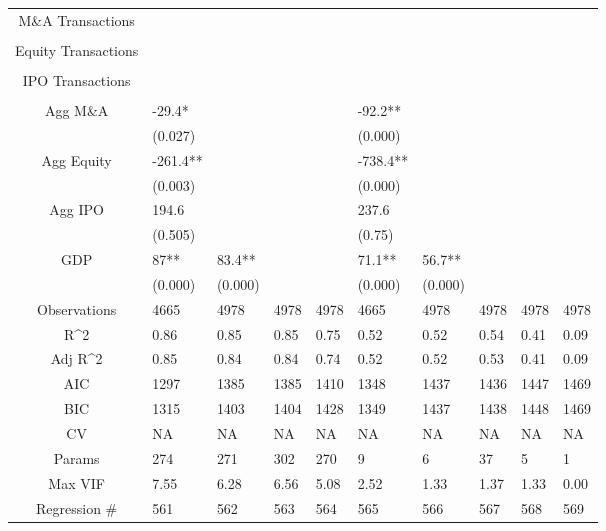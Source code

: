 \documentclass{article}
\begin{document}
\begin{table}[H]
\begin{tabular}{|clllllllll|}
  M\&A Transactions &  &  &  &  &  &  &  &  &  \\ 
   &  &  &  &  &  &  &  &  &  \\ 
  Equity Transactions &  &  &  &  &  &  &  &  &  \\ 
   &  &  &  &  &  &  &  &  &  \\ 
  IPO Transactions &  &  &  &  &  &  &  &  &  \\ 
   &  &  &  &  &  &  &  &  &  \\ 
  Agg M\&A & -29.4* &  &  &  & -92.2** &  &  &  &  \\ 
   & (0.027) &  &  &  & (0.000) &  &  &  &  \\ 
  Agg Equity & -261.4** &  &  &  & -738.4** &  &  &  &  \\ 
   & (0.003) &  &  &  & (0.000) &  &  &  &  \\ 
  Agg IPO & 194.6 &  &  &  & 237.6 &  &  &  &  \\ 
   & (0.505) &  &  &  & (0.75) &  &  &  &  \\ 
  GDP & 87** & 83.4** &  &  & 71.1** & 56.7** &  &  &  \\ 
   & (0.000) & (0.000) &  &  & (0.000) & (0.000) &  &  &  \\ 
  \hline 
 Observations & 4665 & 4978 & 4978 & 4978 & 4665 & 4978 & 4978 & 4978 & 4978 \\ 
  R^2 & 0.86 & 0.85 & 0.85 & 0.75 & 0.52 & 0.52 & 0.54 & 0.41 & 0.09 \\ 
  Adj R^2 & 0.85 & 0.84 & 0.84 & 0.74 & 0.52 & 0.52 & 0.53 & 0.41 & 0.09 \\ 
  AIC & 1297 & 1385 & 1385 & 1410 & 1348 & 1437 & 1436 & 1447 & 1469 \\ 
  BIC & 1315 & 1403 & 1404 & 1428 & 1349 & 1437 & 1438 & 1448 & 1469 \\ 
  CV & NA & NA & NA & NA & NA & NA & NA & NA & NA \\ 
  Params & 274 & 271 & 302 & 270 & 9 & 6 & 37 & 5 & 1 \\ 
  Max VIF & 7.55 & 6.28 & 6.56 & 5.08 & 2.52 & 1.33 & 1.37 & 1.33 & 0.00 \\ 
  Regression \# & 561 & 562 & 563 & 564 & 565 & 566 & 567 & 568 & 569 \\ 
   \hline
\end{tabular}
 
\end{table}
\end{document}
